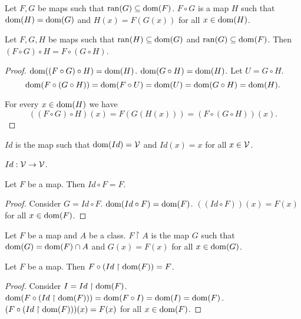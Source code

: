 \documentclass{article}
\begin{document}
\begin{forthel}
\begin{signature}
Let $F,G$ be maps such that $\operatorname{ran}(G) \subseteq \operatorname{dom}(F)$.
$F \circ G$ is a map $H$ such that $\operatorname{dom}(H) = \operatorname{dom}(G)$ and
$H(x) = F(G(x))$ for all $x \in \operatorname{dom}(H)$.
\end{signature}

\begin{lemma}
Let $F,G,H$ be maps such that $\operatorname{ran}(H) \subseteq \operatorname{dom}(G)$ and
$\operatorname{ran}(G) \subseteq \operatorname{dom}(F)$.
Then $(F \circ G) \circ H = F \circ (G \circ H)$.
\end{lemma}
\begin{proof}
$\operatorname{dom}((F \circ G) \circ H) = \operatorname{dom}(H)$.
$\operatorname{dom}(G \circ H) = \operatorname{dom}(H)$. Let $U = G \circ H$.
$$\operatorname{dom}(F \circ (G \circ H)) = 
\operatorname{dom}(F \circ U) = \operatorname{dom}(U) = \operatorname{dom}(G \circ H) = \operatorname{dom}(H).$$

For every $x \in \operatorname{dom}(H)$ we have  
$$((F \circ G) \circ H)(x) = F(G(H(x))) =
(F \circ (G \circ H))(x).$$
\end{proof}

\begin{signature}
$Id$ is the map such that $\operatorname{dom}(Id) = {\cal V}$
and $Id(x) = x$ for all $x \in {\cal V}$.
\end{signature}

\begin{lemma}
$Id : {\cal V} \rightarrow {\cal V}$.
\end{lemma}

\begin{lemma}
Let $F$ be a map. Then $Id \circ F = F$.
\end{lemma}
\begin{proof} Consider $G = Id \circ F$.
$\operatorname{dom}(Id \circ F) = \operatorname{dom}(F)$.
$((Id \circ F))(x) = F(x)$ for all $x \in \operatorname{dom}(F)$.
\end{proof}

\begin{signature}
Let $F$ be a map and $A$ be a class.
$F\upharpoonright A$ is the map $G$ such that
$\operatorname{dom}(G) = \operatorname{dom}(F) \cap A$ and $G(x)=F(x)$
for all $x \in \operatorname{dom}(G)$.
\end{signature}

\begin{lemma}
Let $F$ be a map. Then $F \circ (Id \upharpoonright \operatorname{dom}(F)) = F$.
\end{lemma}
\begin{proof} Consider $I = Id \upharpoonright \operatorname{dom}(F)$.
$\operatorname{dom}(F \circ (Id \upharpoonright \operatorname{dom}(F))) = 
\operatorname{dom}(F \circ I) = \operatorname{dom}(I) = \operatorname{dom}(F)$.
$(F \circ (Id \upharpoonright \operatorname{dom}(F)))(x) = F(x)$ 
for all $x \in \operatorname{dom}(F)$.
\end{proof}

\end{forthel}
\end{document}
